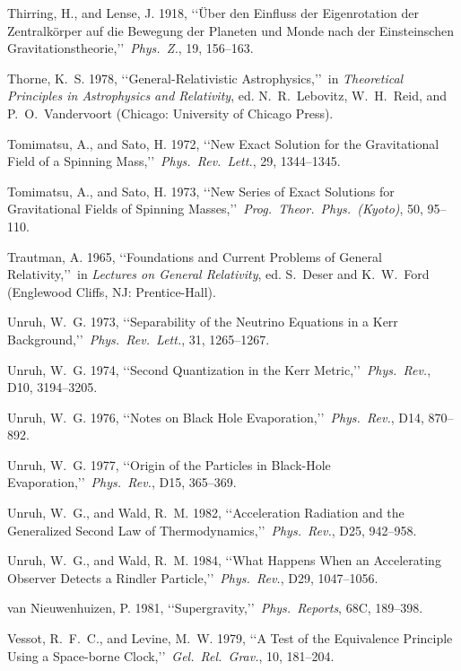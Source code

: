 \item Thirring, H., and Lense, J. 1918, \lq\lq {\"U}ber den Einfluss der Eigenrotation der Zentralk{\"o}rper auf die Bewegung der Planeten und Monde nach der Einsteinschen Gravitationstheorie,\rq\rq\ \emph{Phys.\ Z.}, 19, 156--163.
\item Thorne, K.~S. 1978, \lq\lq General-Relativistic Astrophysics,\rq\rq\ in \emph{Theoretical Principles in Astrophysics and Relativity}, ed. N.~R.~Lebovitz, W.~H.~Reid, and P.~O.~Vandervoort (Chicago: University of Chicago Press).
\item Tomimatsu, A., and Sato, H. 1972, \lq\lq New Exact Solution for the Gravitational Field of a Spinning Mass,\rq\rq\ \emph{Phys.\ Rev.\ Lett.}, 29, 1344--1345.
\item Tomimatsu, A., and Sato, H. 1973, \lq\lq New Series of Exact Solutions for Gravitational Fields of Spinning Masses,\rq\rq\ \emph{Prog.\ Theor.\ Phys.\ (Kyoto)}, 50, 95--110.
\item Trautman, A. 1965, \lq\lq Foundations and Current Problems of General Relativity,\rq\rq\ in \emph{Lectures on General Relativity}, ed. S.~Deser and K.~W.~Ford (Englewood Cliffs, NJ: Prentice-Hall).
\item Unruh, W.~G. 1973, \lq\lq Separability of the Neutrino Equations in a Kerr Background,\rq\rq\ \emph{Phys.\ Rev.\ Lett.}, 31, 1265--1267.
\item Unruh, W.~G. 1974, \lq\lq Second Quantization in the Kerr Metric,\rq\rq\ \emph{Phys.\ Rev.}, D10, 3194--3205.
\item Unruh, W.~G. 1976, \lq\lq Notes on Black Hole Evaporation,\rq\rq\ \emph{Phys.\ Rev.}, D14, 870--892.
\item Unruh, W.~G. 1977, \lq\lq Origin of the Particles in Black-Hole Evaporation,\rq\rq\ \emph{Phys.\ Rev.}, D15, 365--369.
\item Unruh, W.~G., and Wald, R.~M. 1982, \lq\lq Acceleration Radiation and the Generalized Second Law of Thermodynamics,\rq\rq\ \emph{Phys.\ Rev.}, D25, 942--958.
\item Unruh, W.~G., and Wald, R.~M. 1984, \lq\lq What Happens When an Accelerating Observer Detects a Rindler Particle,\rq\rq\ \emph{Phys.\ Rev.}, D29, 1047--1056.
\item van Nieuwenhuizen, P. 1981, \lq\lq Supergravity,\rq\rq\ \emph{Phys.\ Reports}, 68C, 189--398.
\item Vessot, R.~F.~C., and Levine, M.~W. 1979, \lq\lq A Test of the Equivalence Principle Using a Space-borne Clock,\rq\rq\ \emph{Gel.\ Rel.\ Grav.}, 10, 181--204.
